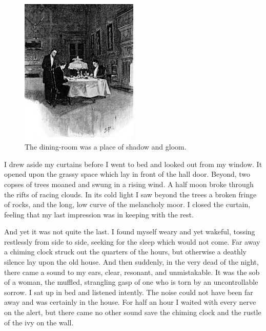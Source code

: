 \documentclass[paper=5.5in:8.5in,BCOR=7mm,twoside,DIV=calc,12pt,usegeometry,openany,chapterprefix,endperiod,headings=big]{scrbook} %
\begin{document}
\begin{figure}[tbh]
\centering
\includegraphics[width=0.5\textwidth]{06_diningroom}
\caption{The dining-room was a place of shadow and gloom.}
\end{figure}

I drew aside my curtains before I went to bed and looked out from my window. It opened upon the grassy space which lay in front of the hall door. Beyond, two copses of trees moaned and swung in a rising wind. A half moon broke through the rifts of racing clouds. In its cold light I saw beyond the trees a broken fringe of rocks, and the long, low curve of the melancholy moor. I closed the curtain, feeling that my last impression was in keeping with the rest.

And yet it was not quite the last. I found myself weary and yet wakeful, tossing restlessly from side to side, seeking for the sleep which would not come. Far away a chiming clock struck out the quarters of the hours, but otherwise a deathly silence lay upon the old house. And then suddenly, in the very dead of the night, there came a sound to my ears, clear, resonant, and unmistakable. It was the sob of a woman, the muffled, strangling gasp of one who is torn by an uncontrollable sorrow. I sat up in bed and listened intently. The noise could not have been far away and was certainly in the house. For half an hour I waited with every nerve on the alert, but there came no other sound save the chiming clock and the rustle of the ivy on the wall.


\end{document}
